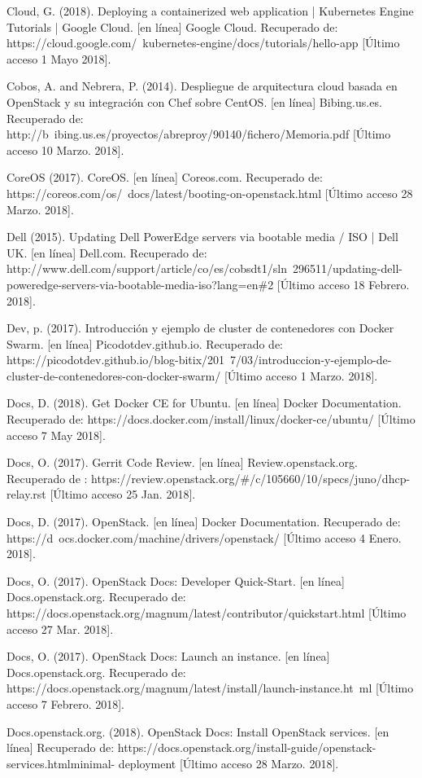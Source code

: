 Cloud, G. (2018). Deploying a containerized web application  |  Kubernetes Engine Tutorials  |  Google Cloud. [en línea] Google Cloud. Recuperado de: https://cloud.google.com/\ kubernetes-engine/docs/tutorials/hello-app [Último acceso 1 Mayo 2018].


Cobos, A. and Nebrera, P. (2014). Despliegue de arquitectura cloud basada en OpenStack y su integración con Chef sobre CentOS. [en línea] Bibing.us.es. Recuperado de: http://b\ ibing.us.es/proyectos/abreproy/90140/fichero/Memoria.pdf [Último acceso 10 Marzo. 2018].

CoreOS (2017). CoreOS. [en línea] Coreos.com. Recuperado de: https://coreos.com/os/\ docs/latest/booting-on-openstack.html [Último acceso 28 Marzo. 2018].


Dell (2015). Updating Dell PowerEdge servers via bootable media / ISO | Dell UK. [en línea] Dell.com. Recuperado de: http://www.dell.com/support/article/co/es/cobsdt1/sln\ 296511/updating-dell-poweredge-servers-via-bootable-media-iso?lang=en\#2 [Último acceso 18 Febrero. 2018].

Dev, p. (2017). Introducción y ejemplo de cluster de contenedores con Docker Swarm. [en línea] Picodotdev.github.io. Recuperado de: https://picodotdev.github.io/blog-bitix/201\ 7/03/introduccion-y-ejemplo-de-cluster-de-contenedores-con-docker-swarm/ [Último acceso 1 Marzo. 2018].


Docs, D. (2018). Get Docker CE for Ubuntu. [en línea] Docker Documentation. Recuperado de: https://docs.docker.com/install/linux/docker-ce/ubuntu/ [Último acceso 7 May 2018].

Docs, O. (2017). Gerrit Code Review. [en línea] Review.openstack.org. Recuperado de : https://review.openstack.org/\#/c/105660/10/specs/juno/dhcp-relay.rst [Último acceso 25 Jan. 2018].

Docs, D. (2017). OpenStack. [en línea] Docker Documentation. Recuperado de: https://d\ ocs.docker.com/machine/drivers/openstack/ [Último acceso 4 Enero. 2018].

Docs, O. (2017). OpenStack Docs: Developer Quick-Start. [en línea] Docs.openstack.org. Recuperado de: https://docs.openstack.org/magnum/latest/contributor/quickstart.html [Último acceso 27 Mar. 2018].

Docs, O. (2017). OpenStack Docs: Launch an instance. [en línea] Docs.openstack.org. Recuperado de: https://docs.openstack.org/magnum/latest/install/launch-instance.ht\ ml [Último acceso 7 Febrero. 2018].

Docs.openstack.org. (2018). OpenStack Docs: Install OpenStack services. [en línea] Recuperado de: https://docs.openstack.org/install-guide/openstack-services.htmlminimal-
deployment [Último acceso 28 Marzo. 2018].

